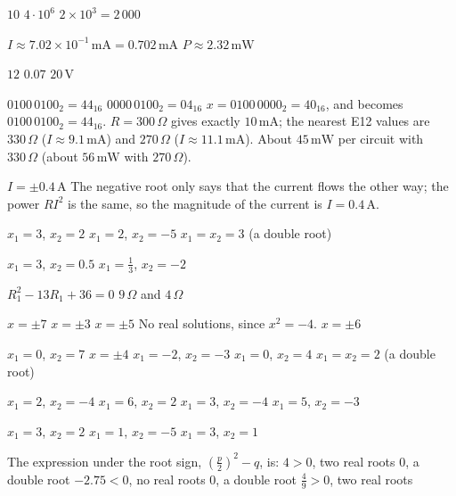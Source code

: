 
\begin{facit}

  $10$  $4 \cdot 10^6$  $2 \times 10^3 = 2\,000$

  $I \approx 7.02 \times 10^{-1}\,\text{mA} = 0.702\,\text{mA}$
 $P \approx 2.32\,\text{mW}$

  $12$  $0.07$  $20\,\text{V}$

  $0100\,0100_2 = \mathrm{44}_{16}$  $0000\,0100_2 = \mathrm{04}_{16}$
 $x = 0100\,0000_2 = \mathrm{40}_{16}$, and  becomes
$0100\,0100_2 = \mathrm{44}_{16}$.
 $R = 300\,\Omega$ gives exactly $10\,\text{mA}$; the nearest E12 values are $330\,\Omega$
($I \approx 9.1\,\text{mA}$) and $270\,\Omega$ ($I \approx 11.1\,\text{mA}$).
 About $45\,\text{mW}$ per circuit with $330\,\Omega$ (about $56\,\text{mW}$ with
$270\,\Omega$).

  $I = \pm 0.4\,\text{A}$
 The negative root only says that the current flows the other way; the power $RI^2$ is the
same, so the magnitude of the current is $I = 0.4\,\text{A}$.

  $x_1 = 3$, $x_2 = 2$  $x_1 = 2$, $x_2 = -5$
 $x_1 = x_2 = 3$ (a double root)

  $x_1 = 3$, $x_2 = 0.5$  $x_1 = \frac{1}{3}$, $x_2 = -2$

  $R_1^2 - 13R_1 + 36 = 0$  $9\,\Omega$ and $4\,\Omega$

  $x = \pm 7$  $x = \pm 3$  $x = \pm 5$
 No real solutions, since $x^2 = -4$.  $x = \pm 6$

  $x_1 = 0$, $x_2 = 7$  $x = \pm 4$  $x_1 = -2$, $x_2 = -3$
 $x_1 = 0$, $x_2 = 4$  $x_1 = x_2 = 2$ (a double root)

  $x_1 = 2$, $x_2 = -4$  $x_1 = 6$, $x_2 = 2$  $x_1 = 3$, $x_2 = -4$
 $x_1 = 5$, $x_2 = -3$

  $x_1 = 3$, $x_2 = 2$  $x_1 = 1$, $x_2 = -5$  $x_1 = 3$, $x_2 = 1$

 The expression under the root sign, $\left(\frac{p}{2}\right)^2 - q$, is:
 $4 > 0$, two real roots  $0$, a double root
 $-2.75 < 0$, no real roots  $0$, a double root
 $\frac{4}{9} > 0$, two real roots


\end{facit}
